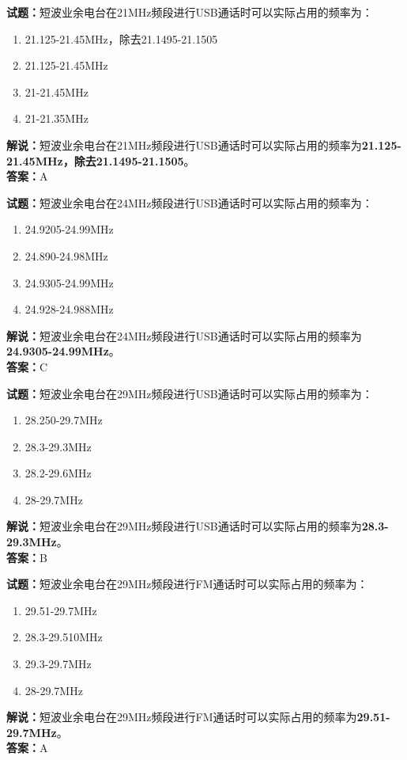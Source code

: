 \documentclass{ctexbook}
\begin{document}
\vspace{1em}

\textbf{试题：}短波业余电台在21\unit{\MHz}频段进行USB通话时可以实际占用的频率为：
\begin{enumerate}[leftmargin=3em]
  \item 21.125-21.45\unit{\MHz}，除去21.1495-21.1505
  \item 21.125-21.45\unit{\MHz}
  \item 21-21.45\unit{\MHz}
  \item 21-21.35\unit{\MHz}
\end{enumerate}
\noindent\textbf{解说：}短波业余电台在21\unit{\MHz}频段进行USB通话时可以实际占用的频率为\textbf{21.125-21.45\unit{\MHz}，除去21.1495-21.1505}。\\\noindent\textbf{答案：}A

\vspace{1em}

\textbf{试题：}短波业余电台在24\unit{\MHz}频段进行USB通话时可以实际占用的频率为：
\begin{enumerate}[leftmargin=3em]
  \item 24.9205-24.99\unit{\MHz}
  \item 24.890-24.98\unit{\MHz}
  \item 24.9305-24.99\unit{\MHz}
  \item 24.928-24.988\unit{\MHz}
\end{enumerate}
\noindent\textbf{解说：}短波业余电台在24\unit{\MHz}频段进行USB通话时可以实际占用的频率为\textbf{24.9305-24.99\unit{\MHz}}。\\\noindent\textbf{答案：}C

\vspace{1em}

\textbf{试题：}短波业余电台在29\unit{\MHz}频段进行USB通话时可以实际占用的频率为：
\begin{enumerate}[leftmargin=3em]
  \item 28.250-29.7\unit{\MHz}
  \item 28.3-29.3\unit{\MHz}
  \item 28.2-29.6\unit{\MHz}
  \item 28-29.7\unit{\MHz}
\end{enumerate}
\noindent\textbf{解说：}短波业余电台在29\unit{\MHz}频段进行USB通话时可以实际占用的频率为\textbf{28.3-29.3\unit{\MHz}}。\\\noindent\textbf{答案：}B

\vspace{1em}

\textbf{试题：}短波业余电台在29\unit{\MHz}频段进行FM通话时可以实际占用的频率为：
\begin{enumerate}[leftmargin=3em]
  \item 29.51-29.7\unit{\MHz}
  \item 28.3-29.510\unit{\MHz}%
  \item 29.3-29.7\unit{\MHz}
  \item 28-29.7\unit{\MHz}
\end{enumerate}
\noindent\textbf{解说：}短波业余电台在29\unit{\MHz}频段进行FM通话时可以实际占用的频率为\textbf{29.51-29.7\unit{\MHz}}。\\\noindent\textbf{答案：}A
\end{document}
